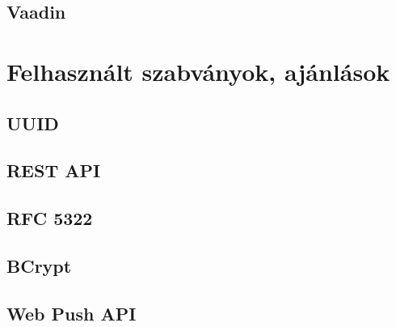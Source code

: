 

\subsection{Vaadin}

\section{Felhasznált szabványok, ajánlások}

\subsection{UUID}

\subsection{REST API}

\subsection{RFC 5322}

\subsection{BCrypt}

\subsection{Web Push API}